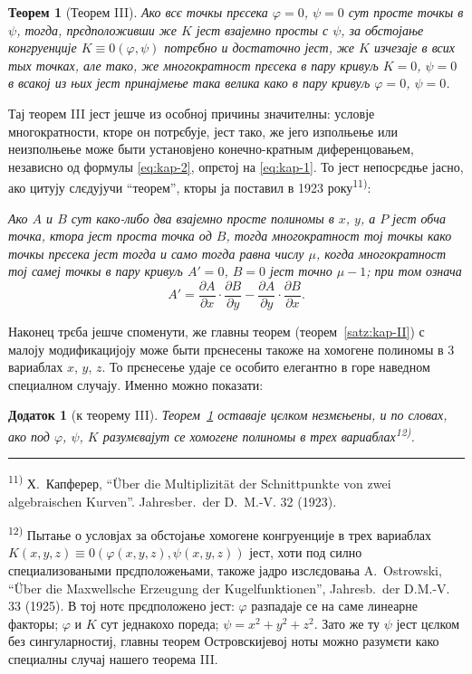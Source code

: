\documentclass[11pt]{article}
\newcommand{\foreign}[1]{#1}
\theoremstyle{plain}
\newtheorem{satz}{Теорем}
\newtheorem{zusatz}{Додаток}
\begin{document}
\begin{satz}[Теорем III]\label{satz:kap-III}
Ако всє точкы прєсека $\varphi = 0$, $\psi = 0$ сут просте точкы в
$\psi$, тогда, прєдположивши же $K$ јест взајемно просты с $\psi$,
за обстојање конгруенције $K \equiv 0(\varphi, \psi)$ потрєбно и
достаточно јест, же $K$ изчезаје в всих тых точках, але тако, же
многократност прєсека в пару кривуљ $K = 0$, $\psi = 0$ в всакој
из њих јест принајмење така велика како в пару кривуљ
$\varphi = 0$, $\psi = 0$.
\end{satz}

Тај теорем III јест јешче из особној причины значителны: условје
многократности, кторе он потрєбује, јест тако, же јего изполњење
или неизполњење може быти установјено конечно-кратным
диференцовањем, независно од формулы \eqref{eq:kap-2}, опрєтој на
\eqref{eq:kap-1}. То јест непосрєдње јасно, ако цитују слєдујучи
``теорем'', кторы ја поставил в 1923 року\textsuperscript{11)}:

\smallskip
\textit{Ако $A$ и $B$ сут како-либо два взајемно просте полиномы в
$x$, $y$, а $P$ јест обча точка, ктора јест проста точка од $B$,
тогда многократност тој точкы како точкы прєсека јест тогда и само
тогда равна числу $\mu$, когда многократност тој самеј точкы в пару
кривуљ $A' = 0$, $B = 0$ јест точно $\mu - 1$; при том означа}
\[
A' = \frac{\partial A}{\partial x} \cdot \frac{\partial B}{\partial y} -
\frac{\partial A}{\partial y} \cdot \frac{\partial B}{\partial x}.
\]

Наконец трєба јешче споменути, же главны теорем
(теорем~\ref{satz:kap-II}) с малоју модификацијоју може быти
прєнесены такоже на хомогене полиномы в 3 вариаблах $x$, $y$, $z$.
То прєнесење удаје се особито елегантно в горе наведном специалном
случају. Именно можно показати:

\begin{zusatz}[к теорему III]
Теорем~\ref{satz:kap-III} оставаје цєлком незмєњены, и по словах,
ако под $\varphi$, $\psi$, $K$ разумєвајут се хомогене полиномы в
трех вариаблах\textsuperscript{12)}.
\end{zusatz}

\vspace{0.5em}
\noindent\rule{\textwidth}{0.4pt}
\vspace{0.3em}

{\footnotesize
\textsuperscript{11)} Х.\ Капферер, ``\foreign{Über die Multiplizität der Schnittpunkte von zwei algebraischen
Kurven}''. \foreign{Jahresber.\ der D.\ M.-V.} 32 (1923).

\textsuperscript{12)} Пытање о условјах за обстојање хомогене конгруенције в
трех вариаблах $K(x,y,z) \equiv 0(\varphi(x,y,z), \psi(x,y,z))$ јест,
хоти под силно специализоваными прєдположењами, такоже јадро
изслєдовања \foreign{A.\ Ostrowski}, ``\foreign{Über die Maxwellsche Erzeugung der
Kugelfunktionen}'', \foreign{Jahresb.\ der D.M.-V.} 33 (1925). В тој
нотє прєдположено јест: $\varphi$ разпадаје се на саме линеарне
факторы; $\varphi$ и $K$ сут једнакохо пореда; $\psi = x^{2} + y^{2} + z^{2}$.
Зато же ту $\psi$ јест цєлком без сингуларностиј, главны теорем
Островскијевој ноты можно разумєти како специалны случај нашего
теорема III.
}
\end{document}
